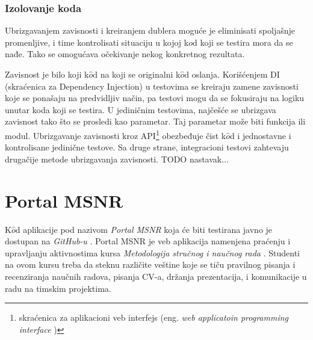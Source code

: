 \documentclass[12pt,oneside]{memoir}
\begin{document}
\subsection{Izolovanje koda} 
\par Ubrizgavanjem zavisnosti i kreiranjem dublera moguće je eliminisati spoljašnje promenljive, i time kontrolisati situaciju u kojoj k${o}$d koji se testira mora da se nađe. Tako se omogućava očekivanje nekog konkretnog rezultata. 
\par Zavisnost je bilo koji k$\hat{o}$d na koji se originalni k$\hat{o}$d oslanja. Korišćenjem DI (skraćenica za Dependency Injection) u testovima se kreiraju zamene zavisnosti koje se ponašaju na predvidljiv način, pa testovi mogu da se fokusiraju na logiku unutar koda koji se testira. U jediničnim testovima, najčešće se ubrizgava zavisnost tako što se prosledi kao parametar. Taj parametar može biti funkcija ili modul. Ubrizgavanje zavisnosti kroz API\footnote{skraćenica za aplikacioni veb interfejs (eng. \textit{web applicatoin
programming interface} )} obezbeđuje čist k$\hat{o}$d i jednostavne i kontrolisane jedinične testove. Sa druge strane, integracioni testovi zahtevaju drugačije metode ubrizgavanja zavisnosti. TODO nastavak...


\chapter{Portal MSNR}
\label{chp:msnr}

\par K$\hat{o}$d aplikacije pod nazivom \emph{Portal MSNR} koja će biti testirana javno je dostupan na \emph{GitHub-u} \cite{msnr-portal}. Portal MSNR je veb aplikacija namenjena praćenju i upravljanju aktivnostima kursa \emph{Metodologija stručnog i naučnog rada} \cite{rad}. Studenti na ovom kursu treba da steknu različite veštine koje se tiču pravilnog pisanja i recenziranja naučnih radova, pisanja CV-a, držanja prezentacija, i komunikacije u radu na timskim projektima. 
\end{document}
